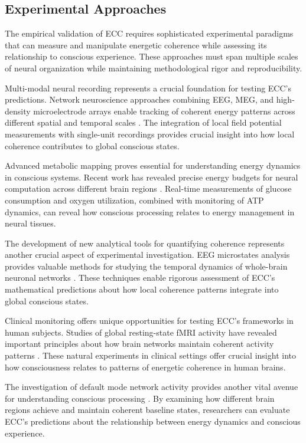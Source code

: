\begin{refsection}
\section{Experimental Approaches}

The empirical validation of ECC requires sophisticated experimental paradigms that can measure and manipulate energetic coherence while assessing its relationship to conscious experience. These approaches must span multiple scales of neural organization while maintaining methodological rigor and reproducibility.

Multi-modal neural recording represents a crucial foundation for testing ECC's predictions. Network neuroscience approaches combining EEG, MEG, and high-density microelectrode arrays enable tracking of coherent energy patterns across different spatial and temporal scales \cite{Bassett2017}. The integration of local field potential measurements with single-unit recordings provides crucial insight into how local coherence contributes to global conscious states.

Advanced metabolic mapping proves essential for understanding energy dynamics in conscious systems. Recent work has revealed precise energy budgets for neural computation across different brain regions \cite{Howarth2012}. Real-time measurements of glucose consumption and oxygen utilization, combined with monitoring of ATP dynamics, can reveal how conscious processing relates to energy management in neural tissues.

The development of new analytical tools for quantifying coherence represents another crucial aspect of experimental investigation. EEG microstates analysis provides valuable methods for studying the temporal dynamics of whole-brain neuronal networks \cite{Michel2018}. These techniques enable rigorous assessment of ECC's mathematical predictions about how local coherence patterns integrate into global conscious states.

Clinical monitoring offers unique opportunities for testing ECC's frameworks in human subjects. Studies of global resting-state fMRI activity have revealed important principles about how brain networks maintain coherent activity patterns \cite{Scholvinck2013}. These natural experiments in clinical settings offer crucial insight into how consciousness relates to patterns of energetic coherence in human brains.

The investigation of default mode network activity provides another vital avenue for understanding conscious processing \cite{Raichle2015}. By examining how different brain regions achieve and maintain coherent baseline states, researchers can evaluate ECC's predictions about the relationship between energy dynamics and conscious experience.


\end{refsection}
